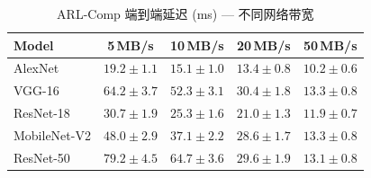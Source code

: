 \begin{table}[htbp]
\centering
\caption{ARL-Comp 端到端延迟 (ms) --- 不同网络带宽}
\label{tab:arl_bandwidth}
\begin{tabular}{lcccc}
\toprule
\textbf{Model} & \textbf{5\,MB/s} & \textbf{10\,MB/s} & \textbf{20\,MB/s} & \textbf{50\,MB/s} \\
\midrule
AlexNet & $19.2\pm1.1$ & $15.1\pm1.0$ & $13.4\pm0.8$ & $10.2\pm0.6$ \\
VGG-16 & $64.2\pm3.7$ & $52.3\pm3.1$ & $30.4\pm1.8$ & $13.3\pm0.8$ \\
ResNet-18 & $30.7\pm1.9$ & $25.3\pm1.6$ & $21.0\pm1.3$ & $11.9\pm0.7$ \\
MobileNet-V2 & $48.0\pm2.9$ & $37.1\pm2.2$ & $28.6\pm1.7$ & $13.3\pm0.8$ \\
ResNet-50 & $79.2\pm4.5$ & $64.7\pm3.6$ & $29.6\pm1.9$ & $13.1\pm0.8$ \\
\bottomrule
\end{tabular}
\end{table}
